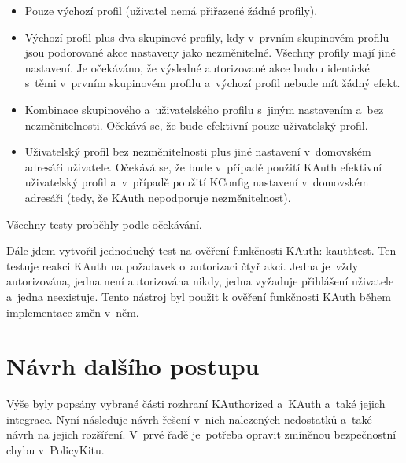 \begin{itemize}
\item Pouze výchozí profil (uživatel nemá přiřazené žádné profily).
\item Výchozí profil plus dva skupinové profily, kdy v~prvním skupinovém profilu jsou podorované akce nastaveny jako nezměnitelné. Všechny profily mají jiné nastavení. Je očekáváno, že výsledné autorizované akce budou identické s~těmi v~prvním skupinovém profilu a~výchozí profil nebude mít žádný efekt.
\item Kombinace skupinového a~uživatelského profilu s~jiným nastavením a~bez nezměnitelnosti. Očekává se, že bude efektivní pouze uživatelský profil.
\item Uživatelský profil bez nezměnitelnosti plus jiné nastavení v~domovském adresáři uživatele. Očekává se, že bude v~případě použití KAuth efektivní uživatelský profil a~v~případě použití KConfig nastavení v~domovském adresáři (tedy, že KAuth nepodporuje nezměnitelnost).
\end{itemize}

Všechny testy proběhly podle očekávání.

Dále jdem vytvořil jednoduchý test na ověření funkčnosti KAuth: kauthtest. Ten testuje reakci KAuth na požadavek o~autorizaci čtyř akcí. Jedna je~vždy autorizována, jedna není autorizována nikdy, jedna vyžaduje přihlášení uživatele a~jedna neexistuje. Tento nástroj byl použit k ověření funkčnosti KAuth během implementace změn v~něm.

\section{Návrh dalšího postupu}
Výše byly popsány vybrané části rozhraní KAuthorized a~KAuth a~také jejich integrace. Nyní následuje návrh řešení v~nich nalezených nedostatků a~také návrh na jejich rozšíření. V~prvé řadě je~potřeba opravit zmíněnou bezpečnostní chybu v~PolicyKitu. 

